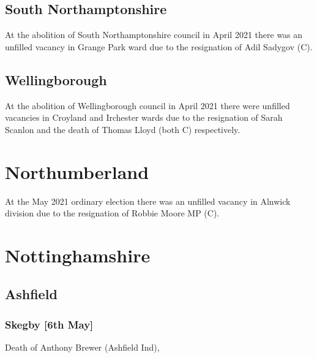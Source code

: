 \documentclass[a4paper,openany]{book}
\begin{document}
\begin{resultsiii}
\subsection*{South Northamptonshire}

At the abolition of South Northamptonshire council in April 2021 there was an unfilled vacancy in Grange Park ward due to the resignation of Adil Sadygov (C).

\subsection*{Wellingborough}

At the abolition of Wellingborough council in April 2021 there were unfilled vacancies in Croyland and Irchester wards due to the resignation of Sarah Scanlon and the death of Thomas Lloyd (both C) respectively.

\section{Northumberland}

At the May 2021 ordinary election there was an unfilled vacancy in Alnwick division due to the resignation of Robbie Moore MP (C).

\section{Nottinghamshire}

\subsection*{Ashfield}

\subsubsection*{Skegby \hspace*{\fill}\nolinebreak[1]%
	\enspace\hspace*{\fill}
	[6th May]}


Death of Anthony Brewer (Ashfield Ind),


\end{resultsiii}
\end{document}
